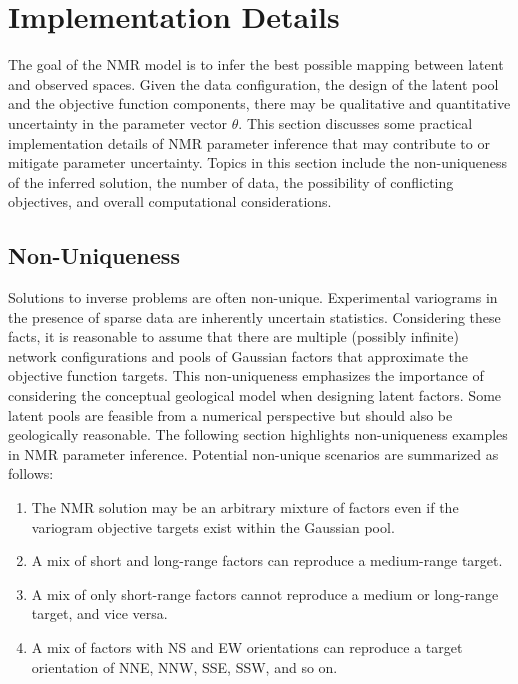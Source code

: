 \FloatBarrier
\section{Implementation Details}
\label{sec:04implementd}

The goal of the \gls{NMR} model is to infer the best possible mapping between latent and observed spaces. Given the data configuration, the design of the latent pool and the objective function components, there may be qualitative and quantitative uncertainty in the parameter vector $\theta$. This section discusses some practical implementation details of \gls{NMR} parameter inference that may contribute to or mitigate parameter uncertainty. Topics in this section include the non-uniqueness of the inferred solution, the number of data, the possibility of conflicting objectives, and overall computational considerations.

\FloatBarrier
\subsection{Non-Uniqueness}
\label{subsec:04nonunique}

Solutions to inverse problems are often non-unique. Experimental variograms in the presence of sparse data are inherently uncertain statistics. Considering these facts, it is reasonable to assume that there are multiple (possibly infinite) network configurations and pools of Gaussian factors that approximate the objective function targets. This non-uniqueness emphasizes the importance of considering the conceptual geological model when designing latent factors. Some latent pools are feasible from a numerical perspective but should also be geologically reasonable. The following section highlights non-uniqueness examples in \gls{NMR} parameter inference. Potential non-unique scenarios are summarized as follows:
\begin{enumerate}[noitemsep]
    \item The \gls{NMR} solution may be an arbitrary mixture of factors even if the variogram objective targets exist within the Gaussian pool.
    \item A mix of short and long-range factors can reproduce a medium-range target.
    \item A mix of only short-range factors cannot reproduce a medium or long-range target, and vice versa.
    \item A mix of factors with NS and EW orientations can reproduce a target orientation of NNE, NNW, SSE, SSW, and so on.
\end{enumerate}

